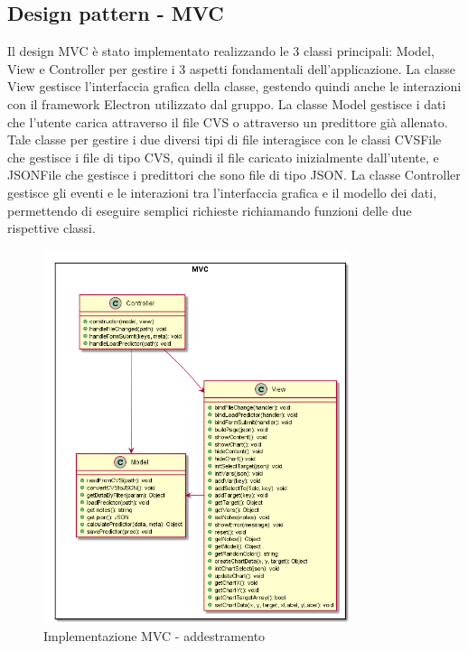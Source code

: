 \documentclass[../manuale-sviluppatore.tex]{subfiles}
\begin{document}
\subsection{Design pattern - MVC}
\label{ssec:design_pattern_mvc}
Il design MVC è stato implementato realizzando le 3 classi principali: Model, View e Controller per gestire i 3 aspetti fondamentali dell'applicazione.
La classe View gestisce l'interfaccia grafica della classe, gestendo quindi anche le interazioni con il framework Electron utilizzato dal gruppo.
La classe Model gestisce i dati che l'utente carica attraverso il file CVS o attraverso un predittore già allenato. Tale classe per gestire i due diversi tipi di file interagisce con le classi
CVSFile che gestisce i file di tipo CVS, quindi il file caricato inizialmente dall'utente, e JSONFile che gestisce i predittori che sono file di tipo JSON.
La classe Controller gestisce gli eventi e le interazioni tra l'interfaccia grafica e il modello dei dati, permettendo di eseguire semplici richieste richiamando funzioni delle due rispettive classi.

\begin{figure}[H]
    \begin{center}
         \includegraphics[width=9cm]{img/mvcTA.png}
         \caption{Implementazione MVC - addestramento}
         \label{fig:MVC}
     \end{center}
 \end{figure}
\end{document}
